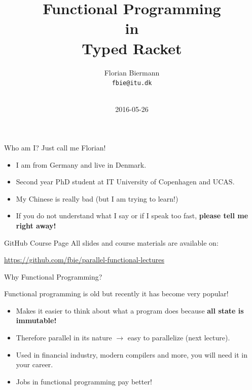 \documentclass{beamer}
\title{Functional Programming\\ in\\ Typed Racket}
\author{Florian Biermann \\\small{\texttt{fbie@itu.dk}} \\~}
\institute{IT University of Copenhagen \& UCAS}
\date{2016-05-26}
\begin{document}
\begin{frame}
  \titlepage{}
\end{frame}

\begin{frame}{Who am I?}
  Just call me Florian!

  \begin{itemize}
  \pause{} \item I am from Germany and live in Denmark.
  \pause{} \item Second year PhD student at IT University of Copenhagen and UCAS.
  \pause{} \item My Chinese is really bad (but I am trying to learn!)
  \pause{} \item If you do not understand what I say or if I speak too fast, \textbf{please tell me right away!}
  \end{itemize}
\end{frame}

\begin{frame}{GitHub Course Page}
  All slides and course materials are available on:

  \begin{center}
    \url{https://github.com/fbie/parallel-functional-lectures}
  \end{center}
\end{frame}

\begin{frame}{Why Functional Programming?}

  Functional programming is old but recently it has become very popular!

  \begin{itemize}
  \pause{} \item Makes it easier to think about what a program does because \textbf{all state is immutable!}
  \pause{} \item Therefore parallel in its nature $\rightarrow$ easy to parallelize (next lecture).
  \pause{} \item Used in financial industry, modern compilers and more, you will need it in your career.
  \pause{} \item Jobs in functional programming pay better!
  \end{itemize}

\end{frame}
\end{document}
